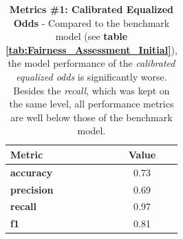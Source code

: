 \begin{table}[!htbp]
    \centering
    \begin{tabular}{l c}
    \toprule
    \textbf{Metric} & \textbf{Value} \\
    \midrule
    \textbf{accuracy} & 0.73 \\
    \textbf{precision} & 0.69 \\
    \textbf{recall} & 0.97 \\
    \textbf{f1} & 0.81 \\
    \bottomrule
    \end{tabular}
    \medskip
    \caption[Metrics \#1: Calibrated Equalized Odds]{\textbf{Metrics \#1: Calibrated Equalized Odds} - Compared to the benchmark model (see \textbf{table \ref{tab:Fairness_Assessment_Initial}}), the model performance of the \textit{calibrated equalized odds} is significantly worse. Besides the \textit{recall}, which was kept on the same level, all performance metrics are well below those of the benchmark model.}
    \label{tab:Model_Evaluation_Cal_Eq_Odd}
\end{table}


